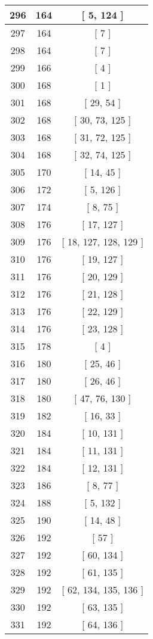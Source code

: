 \begin{center}
\begin{longtable}[H]{|| c c c ||}
296 & 164 & [ 5, 124 ]
\\\hline
297 & 164 & [ 7 ]
\\\hline
298 & 164 & [ 7 ]
\\\hline
299 & 166 & [ 4 ]
\\\hline
300 & 168 & [ 1 ]
\\\hline
301 & 168 & [ 29, 54 ]
\\\hline
302 & 168 & [ 30, 73, 125 ]
\\\hline
303 & 168 & [ 31, 72, 125 ]
\\\hline
304 & 168 & [ 32, 74, 125 ]
\\\hline
305 & 170 & [ 14, 45 ]
\\\hline
306 & 172 & [ 5, 126 ]
\\\hline
307 & 174 & [ 8, 75 ]
\\\hline
308 & 176 & [ 17, 127 ]
\\\hline
309 & 176 & [ 18, 127, 128, 129 ]
\\\hline
310 & 176 & [ 19, 127 ]
\\\hline
311 & 176 & [ 20, 129 ]
\\\hline
312 & 176 & [ 21, 128 ]
\\\hline
313 & 176 & [ 22, 129 ]
\\\hline
314 & 176 & [ 23, 128 ]
\\\hline
315 & 178 & [ 4 ]
\\\hline
316 & 180 & [ 25, 46 ]
\\\hline
317 & 180 & [ 26, 46 ]
\\\hline
318 & 180 & [ 47, 76, 130 ]
\\\hline
319 & 182 & [ 16, 33 ]
\\\hline
320 & 184 & [ 10, 131 ]
\\\hline
321 & 184 & [ 11, 131 ]
\\\hline
322 & 184 & [ 12, 131 ]
\\\hline
323 & 186 & [ 8, 77 ]
\\\hline
324 & 188 & [ 5, 132 ]
\\\hline
325 & 190 & [ 14, 48 ]
\\\hline
326 & 192 & [ 57 ]
\\\hline
327 & 192 & [ 60, 134 ]
\\\hline
328 & 192 & [ 61, 135 ]
\\\hline
329 & 192 & [ 62, 134, 135, 136 ]
\\\hline
330 & 192 & [ 63, 135 ]
\\\hline
331 & 192 & [ 64, 136 ]
\\\hline

\end{longtable}
\end{center}
